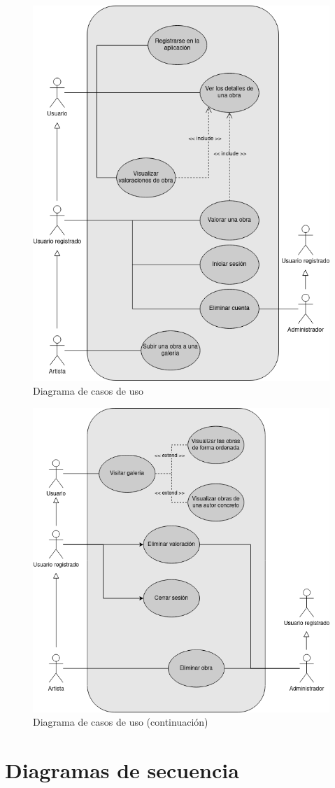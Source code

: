 \begin{figure}[H]
    \centering
    \includegraphics[width=1\textwidth]{img/casos_de_uso.png}
    \caption{Diagrama de casos de uso}
    \label{fig:casos_de_uso}
\end{figure}

\begin{figure}[H]
    \centering
    \includegraphics[width=1\textwidth]{img/casos_de_uso_2.png}
    \caption{Diagrama de casos de uso (continuación)}
    \label{fig:casos_de_uso_continuacion}
\end{figure}

\newpage
\section{Diagramas de secuencia}
